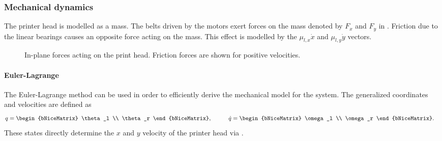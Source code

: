 \documentclass[a4paper,11pt]{article}
\begin{document}
\subsubsection{Mechanical dynamics}
The printer head is modelled as a mass. The belts driven by the motors exert forces on the mass denoted by $F_x$ and $F_y$ in . Friction due to the linear bearings causes an opposite force acting on the mass. This effect is modelled by the $\mu_{l,x}\dot{x}$ and $\mu_{l,y}\dot{y}$ vectors.
\begin{figure}[htbp] 
    \centering 
    \caption{In-plane forces acting on the print head. Friction forces are shown for
    positive velocities.} 
    \label{fig:printhead-forces} 
\end{figure}

\paragraph{Euler-Lagrange}
The Euler-Lagrange method can be used in order to efficiently derive the mechanical model for the system.
The generalized coordinates and velocities are defined as
\begin{equation}
\begin{aligned}
    q &=
    \begin{bNiceMatrix}
        \theta_l \\
        \theta_r
    \end{bNiceMatrix},
    &\qquad
    \dot{q} &=
    \begin{bNiceMatrix}
        \omega_l \\
        \omega_r
    \end{bNiceMatrix}.
\end{aligned}
\end{equation}
These states directly determine the $x$ and $y$ velocity of the printer head via .
\end{document}
